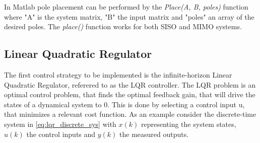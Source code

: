 %

In Matlab pole placement can be performed by the \textit{Place(A, B, poles)} function where "A" is the system matrix, "B" the input matrix and "poles" an array of the desired poles. The \textit{place()} function works for both SISO and MIMO systems.


\subsection{Linear Quadratic Regulator}
The first control strategy to be implemented is the infinite-horizon Linear Quadratic Regulator, referered to as the LQR controller. The LQR problem is an optimal control problem, that finds the optimal feedback gain, that will drive the states of a dynamical system to 0. This is done by selecting a control input u, that minimizes a relevant cost function. As an example consider the discrete-time system in \cref{eq:lqr_discrete_sys} with $x(k)$ representing the system states, $u(k)$ the control inputs and $y(k)$ the measured outputs.\\

